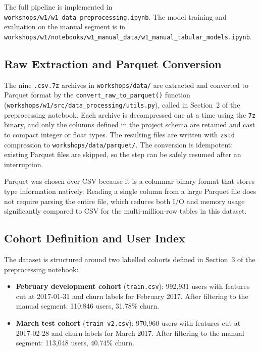 \documentclass{article}
\begin{document}
The full pipeline is implemented in \texttt{workshops/w1/w1\_data\_preprocessing.ipynb}. The model training and evaluation on the manual segment is in \texttt{workshops/w1/notebooks/w1\_manual\_data/w1\_manual\_tabular\_models.ipynb}.

\subsection{Raw Extraction and Parquet Conversion}

The nine \texttt{.csv.7z} archives in \texttt{workshops/data/} are extracted and converted to Parquet format by the \texttt{convert\_raw\_to\_parquet()} function (\texttt{workshops/w1/src/data\_processing/utils.py}), called in Section~2 of the preprocessing notebook. Each archive is decompressed one at a time using the \texttt{7z} binary, and only the columns defined in the project schema are retained and cast to compact integer or float types. The resulting files are written with \texttt{zstd} compression to \texttt{workshops/data/parquet/}. The conversion is idempotent: existing Parquet files are skipped, so the step can be safely resumed after an interruption.

Parquet was chosen over CSV because it is a columnar binary format that stores type information natively. Reading a single column from a large Parquet file does not require parsing the entire file, which reduces both I/O and memory usage significantly compared to CSV for the multi-million-row tables in this dataset.

\subsection{Cohort Definition and User Index}

The dataset is structured around two labelled cohorts defined in Section~3 of the preprocessing notebook:

\begin{itemize}
    \item \textbf{February development cohort} (\texttt{train.csv}): 992{,}931 users with features cut at 2017-01-31 and churn labels for February 2017. After filtering to the manual segment: 110{,}846 users, 31.78\% churn.
    \item \textbf{March test cohort} (\texttt{train\_v2.csv}): 970{,}960 users with features cut at 2017-02-28 and churn labels for March 2017. After filtering to the manual segment: 113{,}048 users, 40.74\% churn.
\end{itemize}
\end{document}
